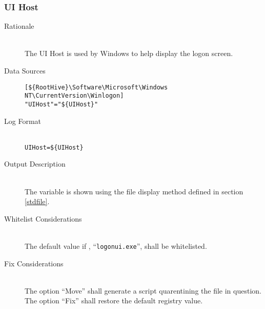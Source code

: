 \subsubsection{UI Host}
\begin{description}
\item[Rationale] \hfill \\
The UI Host is used by Windows to help display the logon screen.
\item[Data Sources] \hfill
\vspace{-\baselineskip}
\begin{verbatim}
[${RootHive}\Software\Microsoft\Windows NT\CurrentVersion\Winlogon]
"UIHost"="${UIHost}"
\end{verbatim}
\item[Log Format] \hfill \\
\verb|UIHost=${UIHost}|
\item[Output Description] \hfill \\
The variable  is shown using the file display method defined in
section \ref{stdfile}.
\item[Whitelist Considerations] \hfill \\
The default value if , ``\verb|logonui.exe|'', shall be whitelisted.
\item[Fix Considerations] \hfill \\
The option ``Move'' shall generate a script quarentining the file in question.
The option ``Fix'' shall restore the default registry value.
\end{description}

